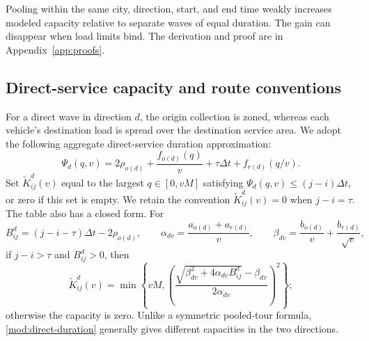 Pooling within the same city, direction, start, and end time weakly
increases modeled capacity relative to separate waves of equal duration.
The gain can disappear when load limits bind. The derivation and proof
are in Appendix~\ref{app:proofs}.

\subsection{Direct-service capacity and route conventions}

For a direct wave in direction $d$, the origin collection is zoned, whereas
each vehicle's destination load is spread over the destination service
area. We adopt the following aggregate direct-service duration approximation:
\begin{equation}
 \Psi_d(q,v)=2\rho_{o(d)}+
 \frac{f_{o(d)}(q)}{v}+\tau\Delta t+f_{r(d)}(q/v).
 \label{mod:direct-duration}
\end{equation}
Set $\widetilde K^d_{ij}(v)$ equal to the largest $q\in[0,vM]$ satisfying
$\Psi_d(q,v)\leq(j-i)\Delta t$, or zero if this set is empty. We retain
the convention $\widetilde K^d_{ij}(v)=0$ when $j-i=\tau$.
The table also has a closed form. For
\begin{equation}
 B_{ij}^d=(j-i-\tau)\Delta t-2\rho_{o(d)},\qquad
 \alpha_{dv}=\frac{a_{o(d)}+a_{r(d)}}{v},\qquad
 \beta_{dv}=\frac{b_{o(d)}}{v}+\frac{b_{r(d)}}{\sqrt v},
 \label{mod:direct-coefficients}
\end{equation}
if $j-i>\tau$ and $B_{ij}^d>0$, then
\begin{equation}
 \widetilde K^d_{ij}(v)=\min\left\{vM,
 \left(\frac{\sqrt{\beta_{dv}^2+4\alpha_{dv}B_{ij}^d}
                   -\beta_{dv}}{2\alpha_{dv}}\right)^2\right\};
 \label{mod:direct-capacity}
\end{equation}
otherwise the capacity is zero. Unlike a symmetric pooled-tour formula,
\eqref{mod:direct-duration} generally gives different capacities in the two
directions.



